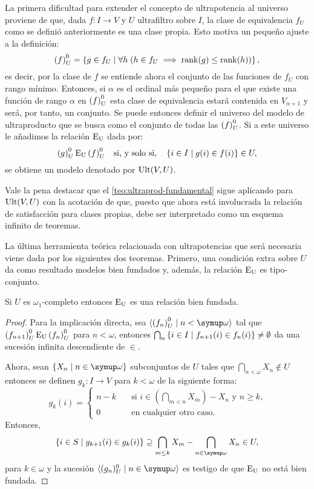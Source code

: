 La primera dificultad para extender el concepto de ultrapotencia al universo
proviene de que, dada $f\colon I\to V$ y $U$ ultrafiltro sobre $I$,
la clase de equivalencia $f_U$ como se definió anteriormente es una clase propia.
Esto motiva un pequeño ajuste a la definición:
\[
    {(f)}_U^0 = \left\{ g \in f_U\mid \forall h\; (h\in f_U\implies \operatorname{rank}(g)\leq\operatorname{rank}(h)) \right\},
\]
es decir, por la clase de $f$ se entiende ahora el conjunto de las funciones
de $f_U$ con rango mínimo. Entonces, si $\alpha$ es el ordinal más pequeño para
el que existe una función de rango $\alpha$ en ${(f)}_U^0$ esta clase de equivalencia estará
contenida en $V_{\alpha+1}$ y será, por tanto, un conjunto. Se puede entonces definir
el universo del modelo de ultraproducto que se busca como el conjunto de todas las ${(f)}_U^0$.
Si a este universo le añadimos la relación $\operatorname{E_U}$ dada por:
\[
    {(g)}_U^0 \operatorname{E_U} {(f)}_U^0
    \quad\text{si, y solo si,}\quad
    \left\{ i\in I\mid g(i)\in f(i) \right\}\in U,
\]
se obtiene un modelo
denotado por $\operatorname{Ult}(V,U)$.

Vale la pena destacar que el \cref{teo:ultraprod-fundamental} sigue aplicando para
$\operatorname{Ult}(V,U)$ con la acotación de que, puesto que ahora está involucrada la relación
de satisfacción para clases propias, debe ser interpretado como un esquema infinito de teoremas.

La última herramienta teórica relacionada con ultrapotencias que será necesaria viene
dada por los siguientes dos teoremas. Primero, una condición extra sobre $U$ da como resultado
modelos bien fundados y, además, la relación $\operatorname{E_U}$ es tipo-conjunto.

\begin{teo}\label{teo:Eu-well-founded}
    Si $U$ es $\omega_1$-completo entonces $\operatorname{E_U}$ es una relación bien fundada.
\end{teo}
\begin{proof}
    Para la implicación directa, sea $\seq{\ecl{f_n}\mid n<\omega}$ tal que
    ${(f_{n+1})}_U^0\operatorname{E_U}{(f_n)}_U^0$ para $n<\omega$,
    entonces $\bigcap_n\left\{ i\in I\mid f_{n+1}(i)\in f_n(i) \right\}\neq\emptyset$
    da una sucesión infinita descendiente de $\in$.

    Ahora, sean $\set{X_n\mid n\in\omega}$ subconjuntos de $U$ tales que
    $\bigcap_{n<\omega} X_n\notin U$ entonces se definen $g_k\colon I\to V$
    para $k<\omega$ de la siguiente forma:
    \[
        g_k(i) =
        \begin{cases}
          n-k\quad & \text{si $i\in(\bigcap_{m<n} X_m) - X_n$ y $n\geq k$,}\\
          0\quad & \text{en cualquier otro caso.}
        \end{cases}
    \]
    Entonces,
    \[
        \set{i\in S\mid g_{k+1}(i)\in g_k(i)}
        \supseteq
        \bigcap_{m\leq k} X_m - \bigcap_{n\in\omega} X_n
        \in U,
    \]
    para $k\in\omega$ y la sucesión $\seq{(g_n)_U^0\mid n\in\omega}$ es testigo de que $\operatorname{E_U}$
    no está bien fundada.
\end{proof}

